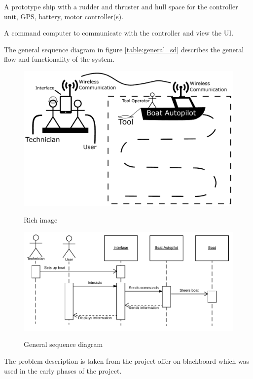 A prototype ship with a rudder and thruster and hull space for the controller unit, GPS, battery, motor controller(s).

A command computer to communicate with the controller and view the UI.

The general sequence diagram in figure \ref{table:general_sd} describes the general flow and functionality of the system.

\begin{figure}[H]
	\centering
	\includegraphics[width=1\linewidth]{Images/Introduction/rich_image}
	\label{fig:rich_image}
	\caption{Rich image}
\end{figure}

\begin{figure}[H]
	\centering
	\includegraphics[width=1\linewidth]{Images/Introduction/General_SD}
	\label{fig:general_sd}
	\caption{General sequence diagram}
\end{figure}

The problem description is taken from the project offer on blackboard\cite{problem_description} which was used in the early phases of the project.

